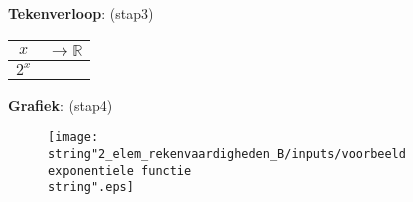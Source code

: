 \begin{itemize}
\noindent \textbf{Tekenverloop}: (stap3) %
\begin{tabular}{|c||c|}
	\hline 
	$x$ & ${\displaystyle \longrightarrow\mathbb{R}}$\tabularnewline
	\hline 
	\hline 
	\multirow{1}{*}{${\displaystyle 2^{x}}$} & \tabularnewline
	\hline 
\end{tabular}

\noindent \textbf{Grafiek}: (stap4) 
\begin{figure}
	\centering
	\texttt{[image: \\string"2\_elem\_rekenvaardigheden\_B/inputs/voorbeeld exponentiele functie\\string".eps]}
\end{figure}

\end{itemize}

